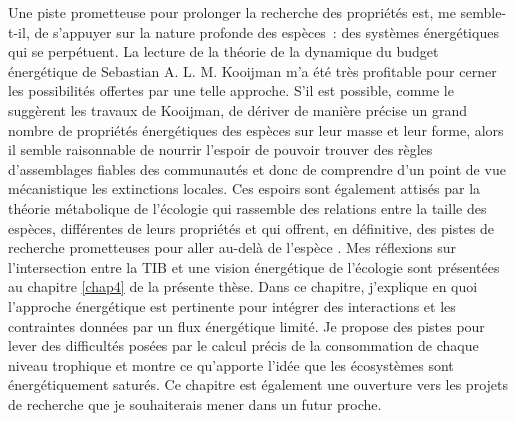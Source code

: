 Une piste prometteuse pour prolonger la recherche des propriétés est, me
semble-t-il, de s'appuyer sur la nature profonde des espèces~: des
systèmes énergétiques qui se perpétuent. La lecture de la théorie de la
dynamique du budget énergétique de Sebastian A. L. M. Kooijman
\citep{Kooijman2000a} m'a été très profitable pour cerner les
possibilités offertes par une telle approche. S'il est possible, comme
le suggèrent les travaux de Kooijman, de dériver de manière précise un
grand nombre de propriétés énergétiques des espèces sur leur masse et
leur forme, alors il semble raisonnable de nourrir l'espoir de pouvoir
trouver des règles d'assemblages fiables des communautés et donc de
comprendre d'un point de vue mécanistique les extinctions locales. Ces
espoirs sont également attisés par la théorie métabolique de l'écologie
qui rassemble des relations entre la taille des espèces, différentes de
leurs propriétés \citep{Brown2004} et qui offrent, en définitive, des
pistes de recherche prometteuses pour aller au-delà de l'espèce
\citep{Poisot2015}. Mes réflexions sur l'intersection entre la TIB et
une vision énergétique de l'écologie sont présentées au chapitre
\ref{chap4} de la présente thèse. Dans ce chapitre, j'explique en quoi
l'approche énergétique est pertinente pour intégrer des interactions et
les contraintes données par un flux énergétique limité. Je propose des
pistes pour lever des difficultés posées par le calcul précis de la
consommation de chaque niveau trophique et montre ce qu'apporte l'idée
que les écosystèmes sont énergétiquement saturés. Ce chapitre est
également une ouverture vers les projets de recherche que je
souhaiterais mener dans un futur proche.
